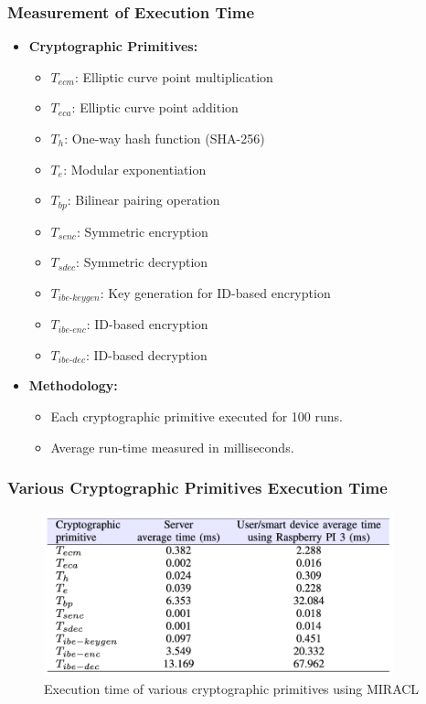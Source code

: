 \documentclass[9pt,handout]{beamer}
\begin{document}
\begin{frame}
    \frametitle{Measurement of Execution Time}
    \begin{itemize}
        \item \textbf{Cryptographic Primitives:}
            \begin{itemize}
                \item \( T_{ecm} \): Elliptic curve point multiplication
                \item \( T_{eca} \): Elliptic curve point addition
                \item \( T_{h} \): One-way hash function (SHA-256)
                \item \( T_{e} \): Modular exponentiation
                \item \( T_{bp} \): Bilinear pairing operation
                \item \( T_{senc} \): Symmetric encryption
                \item \( T_{sdec} \): Symmetric decryption
                \item \( T_{ibe\text{-}keygen} \): Key generation for ID-based encryption
                \item \( T_{ibe\text{-}enc} \): ID-based encryption
                \item \( T_{ibe\text{-}dec} \): ID-based decryption
            \end{itemize}
        \item \textbf{Methodology:}
            \begin{itemize}
                \item Each cryptographic primitive executed for 100 runs.
                \item Average run-time measured in milliseconds.
            \end{itemize}
    \end{itemize}
\end{frame}

\begin{frame}
    \frametitle{Various Cryptographic Primitives Execution Time}
    \begin{figure}
        \centering
        \includegraphics[width=0.9\textwidth]{tabl2.png} %
        \caption{Execution time of various cryptographic primitives using MIRACL}
    \end{figure}
\end{frame}
\end{document}
